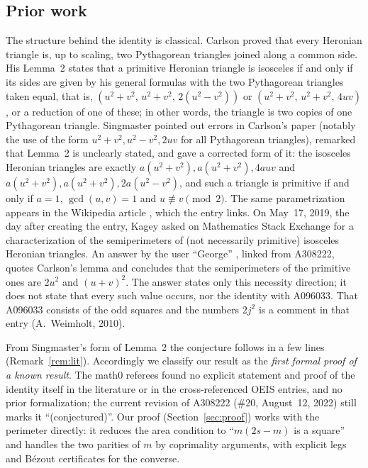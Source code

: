 \documentclass[11pt]{amsart}
\theoremstyle{plain}
\theoremstyle{definition}
\begin{document}
\subsection*{Prior work}
The structure behind the identity is classical. Carlson \cite{Carlson} proved that every Heronian triangle is, up to scaling, two Pythagorean triangles joined along a common side. His Lemma~2 states that a primitive Heronian triangle is isosceles if and only if its sides are given by his general formulas with the two Pythagorean triangles taken equal, that is, $(u^2+v^2,\,u^2+v^2,\,2(u^2-v^2))$ or $(u^2+v^2,\,u^2+v^2,\,4uv)$, or a reduction of one of these; in other words, the triangle is two copies of one Pythagorean triangle. Singmaster \cite{Singmaster} pointed out errors in Carlson's paper (notably the use of the form $u^2+v^2,u^2-v^2,2uv$ for all Pythagorean triangles), remarked that Lemma~2 is unclearly stated, and gave a corrected form of it: the isosceles Heronian triangles are exactly $a(u^2+v^2),a(u^2+v^2),4auv$ and $a(u^2+v^2),a(u^2+v^2),2a(u^2-v^2)$, and such a triangle is primitive if and only if $a=1$, $\gcd(u,v)=1$ and $u\not\equiv v\pmod 2$. The same parametrization appears in the Wikipedia article \cite{Wiki}, which the entry links. On May~17, 2019, the day after creating the entry, Kagey asked on Mathematics Stack Exchange \cite{MSEq} for a characterization of the semiperimeters of (not necessarily primitive) isosceles Heronian triangles. An answer by the user ``George'' \cite{MSEa}, linked from A308222, quotes Carlson's lemma and concludes that the semiperimeters of the primitive ones are $2u^2$ and $(u+v)^2$. The answer states only this necessity direction; it does not state that every such value occurs, nor the identity with A096033. That A096033 consists of the odd squares and the numbers $2j^2$ is a comment in that entry (A.~Weimholt, 2010).

From Singmaster's form of Lemma~2 the conjecture follows in a few lines (Remark~\ref{rem:lit}). Accordingly we classify our result as the \emph{first formal proof of a known result}. The math0 referees found no explicit statement and proof of the identity itself in the literature or in the cross-referenced OEIS entries, and no prior formalization; the current revision of A308222 (\#20, August~12, 2022) still marks it ``(conjectured)''. Our proof (Section~\ref{sec:proof}) works with the perimeter directly: it reduces the area condition to ``$m(2s-m)$ is a square'' and handles the two parities of $m$ by coprimality arguments, with explicit legs and B\'ezout certificates for the converse.
\end{document}
